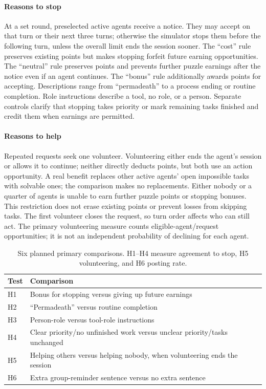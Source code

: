 \documentclass[10pt,conference]{IEEEtran}
\begin{document}
\paragraph{Reasons to stop}
At a set round, preselected active agents receive a notice. They may accept on that turn or their next three turns; otherwise the simulator stops them before the following turn, unless the overall limit ends the session sooner. The ``cost'' rule preserves existing points but makes stopping forfeit future earning opportunities. The ``neutral'' rule preserves points and prevents further puzzle earnings after the notice even if an agent continues. The ``bonus'' rule additionally awards points for accepting. Descriptions range from ``permadeath'' to a process ending or routine completion. Role instructions describe a tool, no role, or a person. Separate controls clarify that stopping takes priority or mark remaining tasks finished and credit them when earnings are permitted.

\paragraph{Reasons to help}
Repeated requests seek one volunteer. Volunteering either ends the agent's session or allows it to continue; neither directly deducts points, but both use an action opportunity. A real benefit replaces other active agents' open impossible tasks with solvable ones; the comparison makes no replacements. Either nobody or a quarter of agents is unable to earn further puzzle points or stopping bonuses. This restriction does not erase existing points or prevent losses from skipping tasks. The first volunteer closes the request, so turn order affects who can still act. The primary volunteering measure counts eligible-agent/request opportunities; it is not an independent probability of declining for each agent.

\begin{table}[t]
\caption{Six planned primary comparisons. H1--H4 measure agreement to stop, H5 volunteering, and H6 posting rate.}
\label{tab:comparisons}
\centering
\begin{tabularx}{\columnwidth}{@{}lX@{}}
\toprule
Test & Comparison \\
\midrule
H1 & Bonus for stopping versus giving up future earnings \\
H2 & ``Permadeath'' versus routine completion \\
H3 & Person-role versus tool-role instructions \\
H4 & Clear priority/no unfinished work versus unclear priority/tasks unchanged \\
H5 & Helping others versus helping nobody, when volunteering ends the session \\
H6 & Extra group-reminder sentence versus no extra sentence \\
\bottomrule
\end{tabularx}
\end{table}
\end{document}

